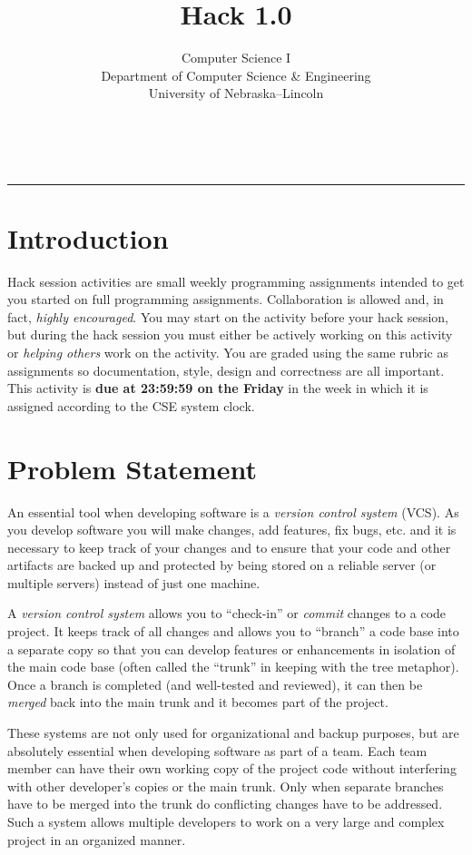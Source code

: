\documentclass[12pt]{scrartcl}
\title{Hack 1.0}\let\Title\@title
\subtitle{Computer Science I\\
{\small
\vskip1cm
Department of Computer Science \& Engineering \\
University of Nebraska--Lincoln}
\vskip-1cm}
\date{~}
\begin{document}
\maketitle

\hrule

\section*{Introduction}

Hack session activities are small weekly programming assignments intended
to get you started on full programming assignments.  Collaboration is allowed
and, in fact, \emph{highly encouraged}.  You may start on the activity before
your hack session, but during the hack session you must either be actively 
working on this activity or \emph{helping others} work on the activity.
You are graded using the same rubric as assignments so documentation, style, 
design and correctness are all important.  This activity is \textbf{due 
at 23:59:59 on the Friday} in the week in which it is assigned according 
to the CSE system clock.

\section*{Problem Statement}

An essential tool when developing software is a \emph{version control system}
(VCS).  As you develop software you will make changes, add features, fix bugs, etc.
and it is necessary to keep track of your changes and to ensure that your 
code and other artifacts are backed up and protected by being stored on a 
reliable server (or multiple servers) instead of just one machine.  

A \emph{version control system} allows you to ``check-in'' or 
\emph{commit} changes to a code project.  It keeps track of all changes 
and allows you to ``branch'' a code base into a separate copy so that 
you can develop features or enhancements in isolation of the
main code base (often called the ``trunk'' in keeping with the tree 
metaphor).  Once a branch is completed (and well-tested and 
reviewed), it can then be \emph{merged} back into the main trunk 
and it becomes part of the project.

These systems are not only used for organizational and backup 
purposes, but are absolutely essential when developing software 
as part of a team.  Each team member can have their own working 
copy of the project code without interfering with other developer's 
copies or the main trunk.  Only when separate branches have to 
be merged into the trunk do conflicting changes have to be addressed.  
Such a system allows multiple developers to work on a 
very large and complex project in an organized manner.
\end{document}
